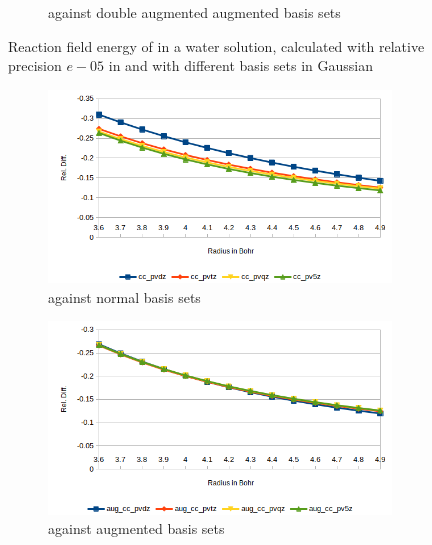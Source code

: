 \documentclass[../master_thesis.tex]{subfiles}
\begin{document}
\begin{figure}[h!]
\begin{subfigure}[b]{0.75\linewidth}
    \caption{\mrchem against double augmented augmented basis sets}
  \end{subfigure}
  \caption[Reaction field energy of ]{Reaction field energy of  in a water solution, calculated with relative precision $e-05$ in \mrchem
  and with different basis sets in Gaussian}
  \label{fig:lipEnergyplots}
\end{figure}

\begin{figure}[h!]
  \centering
  \begin{subfigure}[b]{0.75\linewidth}
    \includegraphics[width=\linewidth]{img/watreldiff.png}
    \caption{\mrchem against normal basis sets}
  \end{subfigure}
  \begin{subfigure}[b]{0.75\linewidth}
    \includegraphics[width=\linewidth]{img/wataugreldiff.png}
    \caption{\mrchem against augmented basis sets}
  \end{subfigure}
  \begin{subfigure}[b]{0.75\linewidth}

\end{subfigure}
\end{figure}
\end{document}

